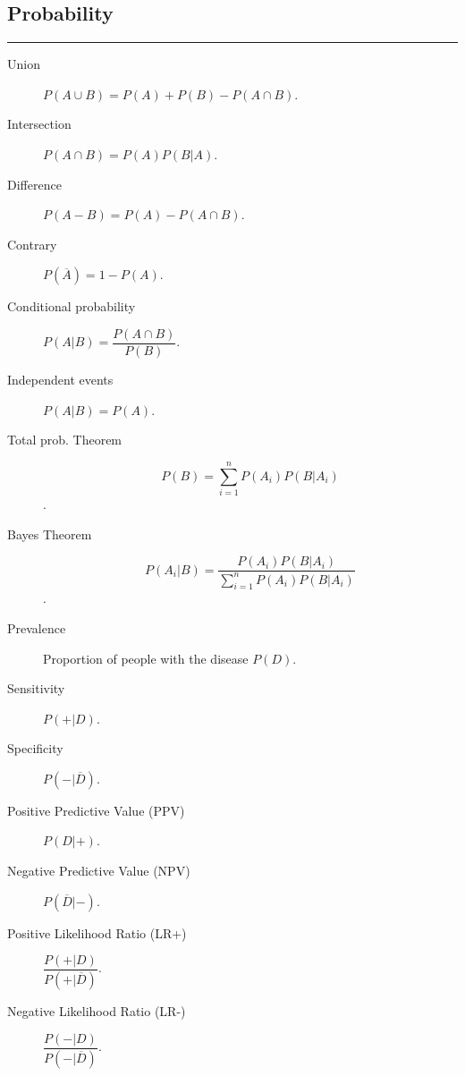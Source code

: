 \documentclass[a4paper, 10pt]{article}
\begin{document}
\newpage

\subsection*{\sffamily Probability}
\begin{multicols}{2}
\begin{tcolorbox}[hbox, title=Basic probability]
\begin{varwidth}{0.4\textwidth}
	\rule{\textwidth}{0pt}
	\begin{description}
		\item [Union] $P(A\cup B)=P(A)+P(B)-P(A\cap B)$.
		\item [Intersection] $P(A\cap B)=P(A)P(B|A)$.
		\item [Difference] $P(A-B)=P(A)-P(A\cap B)$.
		\item [Contrary] $P(\overline{A})=1-P(A)$.
		\item [Conditional probability] $P(A|B)=\dfrac{P(A\cap B)}{P(B)}$.
		\item [Independent events] $P(A|B)=P(A)$.
		\item [Total prob. Theorem] \[P(B)=\sum_{i=1}^n P(A_i)P(B|A_i)\].
		\item [Bayes Theorem] \[P(A_i|B)=\dfrac{P(A_i)P(B|A_i)}{\sum_{i=1}^n P(A_i)P(B|A_i)}\].
	\end{description}
\end{varwidth}
\end{tcolorbox}

\medskip

\begin{tcolorbox}[hbox, title=Diagnostic tests]
\begin{varwidth}{0.4\textwidth}
	\begin{description}
	  \item[Prevalence] Proportion of people with the disease $P(D)$.
	  \item[Sensitivity] $P(+|D)$.
	  \item[Specificity] $P(-|\overline{D})$.
	  \item[Positive Predictive Value (PPV)] $P(D|+)$.
	  \item[Negative Predictive Value (NPV)] $P(\overline{D}|-)$.
	  \item[Positive Likelihood Ratio (LR+)] $\dfrac{P(+|D)}{P(+|\overline{D})}$.
	  \item[Negative Likelihood Ratio (LR-)] $\dfrac{P(-|D)}{P(-|\overline{D})}$.
	\end{description}
\end{varwidth}
\end{tcolorbox}
\end{multicols}
\end{document}
